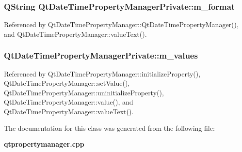 \subsubsection[{m\+\_\+format}]{\setlength{\rightskip}{0pt plus 5cm}Q\+String Qt\+Date\+Time\+Property\+Manager\+Private\+::m\+\_\+format}\label{classQtDateTimePropertyManagerPrivate_a5e8fc6c4354659a8e1e8c1fcf30409ee}


Referenced by Qt\+Date\+Time\+Property\+Manager\+::\+Qt\+Date\+Time\+Property\+Manager(), and Qt\+Date\+Time\+Property\+Manager\+::value\+Text().

\subsubsection[{m\+\_\+values}]{ Qt\+Date\+Time\+Property\+Manager\+Private\+::m\+\_\+values}\label{classQtDateTimePropertyManagerPrivate_a7bc46a13f9e48d4f7b8191fc0296af79}


Referenced by Qt\+Date\+Time\+Property\+Manager\+::initialize\+Property(), Qt\+Date\+Time\+Property\+Manager\+::set\+Value(), Qt\+Date\+Time\+Property\+Manager\+::uninitialize\+Property(), Qt\+Date\+Time\+Property\+Manager\+::value(), and Qt\+Date\+Time\+Property\+Manager\+::value\+Text().



The documentation for this class was generated from the following file\+:\begin{DoxyCompactItemize}
\item 
{\bf qtpropertymanager.\+cpp}\end{DoxyCompactItemize}
